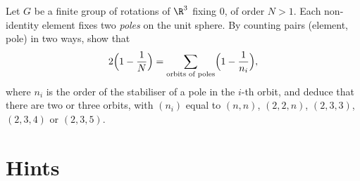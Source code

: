 \begin{exercise}[$\star\star\star$]\label{ex:finiteSO3}
Let $G$ be a finite group of rotations of $\R^3$ fixing $0$, of order $N>1$. Each non-identity element fixes two \emph{poles} on the unit
sphere. By counting pairs (element, pole) in two ways, show that
\[
2\Bigl(1-\frac1N\Bigr)=\sum_{\text{orbits of poles}}\Bigl(1-\frac1{n_i}\Bigr),
\]
where $n_i$ is the order of the stabiliser of a pole in the $i$-th orbit, and deduce that there are two or three orbits, with
$(n_i)$ equal to $(n,n)$, $(2,2,n)$, $(2,3,3)$, $(2,3,4)$ or $(2,3,5)$.
\end{exercise}

\section{Hints}

